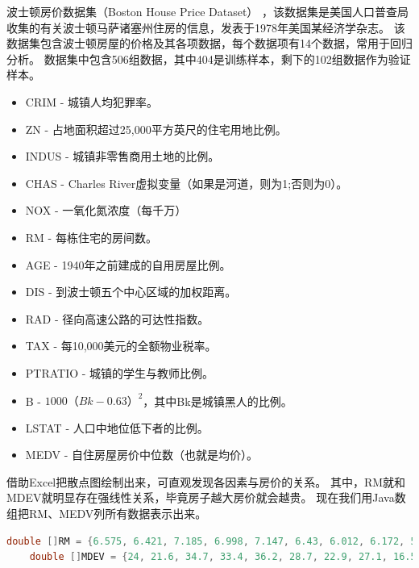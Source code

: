 \begin{example}
	波士顿房价数据集（Boston House Price Dataset）
	，该数据集是美国人口普查局收集的有关波士顿马萨诸塞州住房的信息，发表于1978年美国某经济学杂志。
	该数据集包含波士顿房屋的价格及其各项数据，每个数据项有14个数据，常用于回归分析。
	数据集中包含506组数据，其中404是训练样本，剩下的102组数据作为验证样本。
	\bigskip

	\begin{table}[!htbp]\centering \scriptsize
	\end{table}

	\begin{itemize} \small
		\item CRIM    - 城镇人均犯罪率。
		\item ZN      - 占地面积超过25,000平方英尺的住宅用地比例。
		\item INDUS   - 城镇非零售商用土地的比例。
		\item CHAS    - Charles River虚拟变量（如果是河道，则为1;否则为0）。
		\item NOX     - 一氧化氮浓度（每千万）
		\item RM      - 每栋住宅的房间数。
		\item AGE     - 1940年之前建成的自用房屋比例。
		\item DIS     - 到波士顿五个中心区域的加权距离。
		\item RAD     - 径向高速公路的可达性指数。
		\item TAX       - 每10,000美元的全额物业税率。
		\item PTRATIO - 城镇的学生与教师比例。
		\item B       - $1000（Bk - 0.63）^ 2$，其中Bk是城镇黑人的比例。
		\item LSTAT   - 人口中地位低下者的比例。
		\item MEDV    - 自住房屋房价中位数（也就是均价）。
	\end{itemize}
	\medskip \noindent
	借助Excel把散点图绘制出来，可直观发现各因素与房价的关系。
	其中，RM就和MDEV就明显存在强线性关系，毕竟房子越大房价就会越贵。
	现在我们用Java数组把RM、MEDV列所有数据表示出来。
	\begin{lstlisting}[language=java]
	double []RM = {6.575, 6.421, 7.185, 6.998, 7.147, 6.43, 6.012, 6.172, 5.631};
	double []MDEV = {24, 21.6, 34.7, 33.4, 36.2, 28.7, 22.9, 27.1, 16.5};
	\end{lstlisting}


\end{example}
